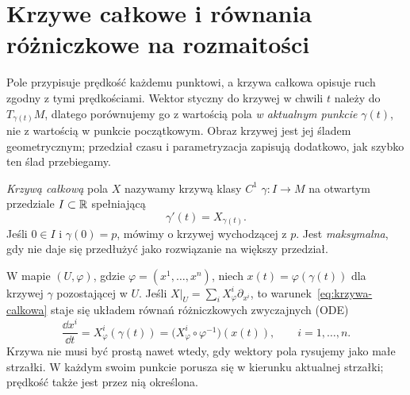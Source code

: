 \section{Krzywe całkowe i równania różniczkowe na rozmaitości}
\label{sec:krzywe}

Pole przypisuje prędkość każdemu punktowi, a krzywa całkowa opisuje
ruch zgodny z tymi prędkościami. Wektor styczny do krzywej w chwili $t$
należy do $T_{\gamma(t)}M$, dlatego porównujemy go z wartością pola
\emph{w aktualnym punkcie} $\gamma(t)$, nie z wartością w punkcie
początkowym. Obraz krzywej jest jej śladem geometrycznym; przedział
czasu i parametryzacja zapisują dodatkowo, jak szybko ten ślad przebiegamy.

\begin{definicja}
\emph{Krzywą całkową} pola $X$ nazywamy krzywą klasy $C^1$
$\gamma\colon I\to M$ na otwartym przedziale $I\subset\mathbb{R}$ spełniającą
\begin{equation}\label{eq:krzywa-calkowa}
 \gamma'(t)=X_{\gamma(t)}.
\end{equation}
Jeśli $0\in I$ i $\gamma(0)=p$, mówimy o krzywej wychodzącej z $p$.
Jest \emph{maksymalna}, gdy nie daje się przedłużyć jako rozwiązanie
na większy przedział.
\end{definicja}

W mapie $(U,\varphi)$, gdzie $\varphi=(x^1,\ldots,x^n)$,
niech $x(t)=\varphi(\gamma(t))$ dla krzywej $\gamma$ pozostającej w $U$.
Jeśli $X|_U=\sum_i X_\varphi^i\partial_{x^i}$,
to warunek~\eqref{eq:krzywa-calkowa} staje się układem równań
różniczkowych zwyczajnych (ODE)
\[
 \frac{\dd x^i}{\dd t}
 =X_\varphi^i(\gamma(t))
 =\bigl(X_\varphi^i\circ\varphi^{-1}\bigr)(x(t)),
 \qquad i=1,\ldots,n.
\]
Krzywa nie musi być prostą nawet wtedy, gdy wektory pola rysujemy
jako małe strzałki. W każdym swoim punkcie porusza się w kierunku
aktualnej strzałki; prędkość także jest przez nią określona.

